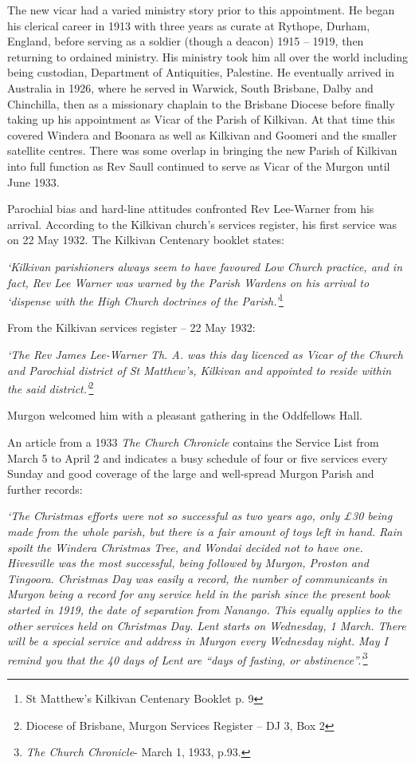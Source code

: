 The new vicar had a varied ministry story prior to this appointment. He began his clerical career in 1913 with three years as curate at Rythope, Durham, England, before serving as a soldier (though a deacon) 1915 -- 1919, then returning to ordained ministry. His ministry took him all over the world including being custodian, Department of Antiquities, Palestine. He eventually arrived in Australia in 1926, where he served in Warwick, South Brisbane, Dalby and Chinchilla, then as a missionary chaplain to the Brisbane Diocese before finally taking up his appointment as Vicar of the Parish of Kilkivan. At that time this covered Windera and Boonara as well as Kilkivan and Goomeri and the smaller satellite centres. There was some overlap in bringing the new Parish of Kilkivan into full function as Rev Saull continued to serve as Vicar of the Murgon until June 1933.



Parochial bias and hard-line attitudes confronted Rev Lee-Warner from his arrival. According to the Kilkivan church's services register, his first service was on 22 May 1932. The Kilkivan Centenary booklet states:



\emph{`Kilkivan parishioners always seem to have favoured Low Church practice, and in fact, Rev Lee Warner was warned by the Parish Wardens on his arrival to `dispense with the High Church doctrines of the Parish.'}\footnote{St Matthew's Kilkivan Centenary Booklet p. 9}


From the Kilkivan services register -- 22 May 1932:



\emph{`The Rev James Lee-Warner Th. A. was this day licenced as Vicar of the Church and Parochial district of St Matthew's, Kilkivan and appointed to reside within the said district.'}\footnote{Diocese of Brisbane, Murgon Services Register -- DJ 3, Box 2}


Murgon welcomed him with a pleasant gathering in the Oddfellows Hall.



An article from a 1933 \emph{The Church Chronicle} contains the Service List from March 5 to April 2 and indicates a busy schedule of four or five services every Sunday and good coverage of the large and well-spread Murgon Parish and further records:



\emph{`The Christmas efforts were not so successful as two years ago, only \pounds30 being made from the whole parish, but there is a fair amount of toys left in hand. Rain spoilt the Windera Christmas Tree, and Wondai decided not to have one. Hivesville was the most successful, being followed by Murgon, Proston and Tingoora. Christmas Day was easily a record, the number of communicants in Murgon being a record for any service held in the parish since the present book started in 1919, the date of separation from Nanango. This equally applies to the other services held on Christmas Day. Lent starts on Wednesday, 1 March. There will be a special service and address in Murgon every Wednesday night. May I remind you that the 40 days of Lent are ``days of fasting, or abstinence''.'}\footnote{\emph{The Church Chronicle}- March 1, 1933, p.93.}


